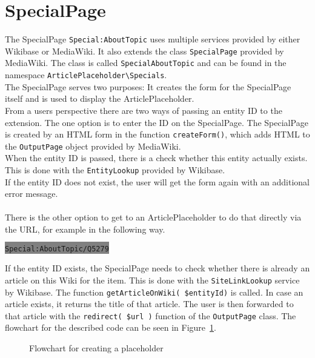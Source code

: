 \section{SpecialPage}

The SpecialPage \texttt{\justify Special:AboutTopic} uses multiple services provided by either Wikibase or MediaWiki. It also extends the class \texttt{\justify SpecialPage} provided by MediaWiki. The class is called \texttt{\justify SpecialAboutTopic} and can be found in the namespace \texttt{\justify ArticlePlaceholder\textbackslash{}Specials}. \\
The SpecialPage serves two purposes: It creates the form for the SpecialPage itself and is used to display the ArticlePlaceholder. \\
From a users perspective there are two ways of passing an entity ID to the extension. 
The one option is to enter the ID on the SpecialPage. The SpecialPage is created by an HTML form in the function \texttt{\justify createForm()}, which adds HTML to the \texttt{\justify OutputPage} object provided by MediaWiki. \\
When the entity ID is passed, there is a check whether this entity actually exists. This is done with the \texttt{\justify EntityLookup} provided by Wikibase. \\ If the entity ID does not exist, the user will get the form again with an additional error message. \\
\\
There is the other option to get to an ArticlePlaceholder to do that directly via the URL, for example in the following way. 
\begin{center}
\colorbox{Gray}{\lstinline[basicstyle=\ttfamily\color{white}]|Special:AboutTopic/Q5279|}
\end{center}

If the entity ID exists, the SpecialPage needs to check whether there is already an article on this Wiki for the item. This is done with the \texttt{\justify SiteLinkLookup} service by Wikibase. The function \texttt{\justify getArticleOnWiki( \$entityId)} is called. In case an article exists, it returns the title of that article. The user is then forwarded to that article with the \texttt{\justify redirect( \$url )} function of the \texttt{\justify OutputPage} class.
The flowchart for the described code can be seen in Figure~\ref{fig:createpl}. 
\begin{figure}[H]
	\centering
	
	\caption{Flowchart for creating a placeholder}
	\label{fig:createpl}
\end{figure}

